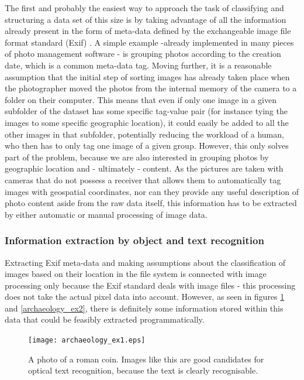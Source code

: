 \documentclass [12pt,a4paper]{report}
\begin{document}
The first and probably the easiest way to approach the task of classifying and structuring a data set of this size is by taking advantage of all the information already present in the form of meta-data defined by the exchangeable image file format standard (Exif) \cite{japan2002jeita}. A simple example -already implemented in many pieces of photo management software - is grouping photos according to the creation date, which is a common meta-data tag. Moving further, it is a reasonable assumption that the initial step of sorting images has already taken place when the photographer moved the photos from the internal memory of the camera to a folder on their computer. This means that even if only one image in a given subfolder of the dataset has some specific tag-value pair (for instance tying the images to some specific geographic location), it could easily be added to all the other images in that subfolder, potentially reducing the workload of a human, who then has to only tag one image of a given group.
However, this only solves part of the problem, because we are also interested in grouping photos by geographic location and - ultimately - content. As the pictures are taken with cameras that do not possess a receiver that allows them to automatically tag images with geospatial coordinates, nor can they provide any useful description of photo content aside from the raw data itself, this information has to be extracted by either automatic or manual processing of image data. 

\subsubsection{Information extraction by object and text recognition}

Extracting Exif meta-data and making assumptions about the classification of images based on their location in the file system is connected with image processing only because the Exif standard deals with image files - this processing does not take the actual pixel data into account. However, as seen in figures \ref{archaeology_ex1} and \ref{archaeology_ex2}, there is definitely some information stored within this data that could be feasibly extracted programmatically. 

\begin{center}
\begin{figure}[h]
\centering
\texttt{[image: archaeology\_ex1.eps]} %
\caption{A photo of a roman coin. Images like this are good candidates for optical text recognition, because the text is clearly recognisable.}
\label{archaeology_ex1}
\end{figure}
\end{center}
\end{document}
